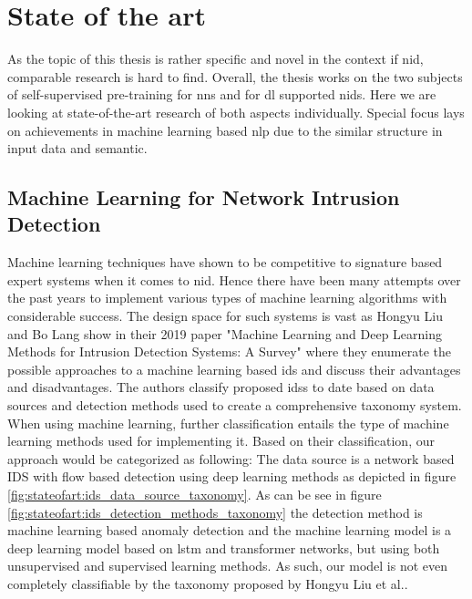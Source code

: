 \chapter{State of the art} \label{sec:stateofart}

As the topic of this thesis is rather specific and novel in the context if \gls{nid}, comparable research is hard to find. Overall, the thesis works on the two subjects of self-supervised pre-training for \glspl{nn} and for \gls{dl} supported \gls{nids}. Here we are looking at state-of-the-art research of both aspects individually. Special focus lays on achievements in machine learning based \gls{nlp} due to the similar structure in input data and semantic.

\section{Machine Learning for Network Intrusion Detection} \label{sec:stateofart:nid}

Machine learning techniques have shown to be competitive to signature based expert systems when it comes to \gls{nid}. Hence there have been many attempts over the past years to implement various types of machine learning algorithms with considerable success. The design space for such systems is vast as Hongyu Liu and Bo Lang show in their 2019 paper \cite{nid_ml_survey_2019} "Machine Learning and Deep Learning Methods for Intrusion Detection Systems: A Survey" where they enumerate the possible approaches to a machine learning based \gls{ids} and discuss their advantages and disadvantages. The authors classify proposed \glspl{ids} to date based on data sources and detection methods used to create a comprehensive taxonomy system. When using machine learning, further classification entails the type of machine learning methods used for implementing it. Based on their classification, our approach would be categorized as following: The data source is a network based IDS with flow based detection using deep learning methods as depicted in figure \ref{fig:stateofart:ids_data_source_taxonomy}. As can be see in figure \ref{fig:stateofart:ids_detection_methods_taxonomy} the detection method is machine learning based anomaly detection and the machine learning model is a deep learning model based on \gls{lstm} and transformer networks, but using both unsupervised and supervised learning methods. As such, our model is not even completely classifiable by the taxonomy proposed by Hongyu Liu et al.. \par

